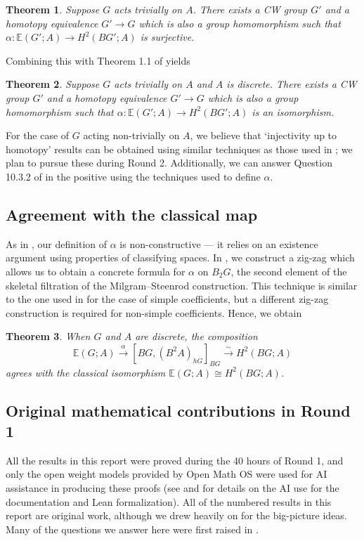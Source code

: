 \documentclass[12 pt]{article}
\newtheorem{theorem}{Theorem}[section]
\theoremstyle{definition}
\newcommand{\E}{\mathbb{E}}
\newcommand{\iso}{\xrightarrow{\sim}}
\begin{document}
\begin{theorem}\label{essential surjectivity}
Suppose $G$ acts trivially on $A$. There exists a CW group $G'$ and a homotopy equivalence $G'\to G$ which is also a group homomorphism such that $\alpha:\E(G';A)\to H^2(BG';A)$ is surjective.
\end{theorem}

Combining this with Theorem 1.1 of \cite{JJS} yields

\begin{theorem}\label{essential bijectivity}
Suppose $G$ acts trivially on $A$ and $A$ is discrete. There exists a CW group $G'$ and a homotopy equivalence $G'\to G$ which is also a group homomorphism such that $\alpha:\E(G';A)\to H^2(BG';A)$ is an isomorphism.
\end{theorem}

For the case of $G$ acting non-trivially on $A$, we believe that `injectivity up to homotopy' results can be obtained using similar techniques as those used in \cite{Ja}; we plan to pursue these during Round 2. Additionally, we can answer Question 10.3.2 of \cite{Ja} in the positive using the techniques used to define $\alpha$.

\subsection{Agreement with the classical map}
As in \cite{Ja, JJS}, our definition of $\alpha$ is non-constructive — it relies on an existence argument using properties of classifying spaces. In , we construct a zig-zag which allows us to obtain a concrete formula for $\alpha$ on $B_2G$, the second element of the skeletal filtration of the Milgram--Steenrod construction. This technique is similar to the one used in \cite{Ja} for the case of simple coefficients, but a different zig-zag construction is required for non-simple coefficients. Hence, we obtain

\begin{theorem}\label{(thm) G A discrete}
When $G$ and $A$ are discrete, the composition
$$\E(G;A)\overset{\alpha}{\to}[BG, (B^2A)_{hG}]_{BG}\iso H^2(BG;A)$$
agrees with the classical isomorphism $\E(G;A)\cong H^2(BG;A)$.
\end{theorem}

\subsection{Original mathematical contributions in Round 1}
All the results in this report were proved during the 40 hours of Round 1, and only the open weight models provided by Open Math OS were used for AI assistance in producing these proofs (see  and  for details on the AI use for the documentation and Lean formalization). All of the numbered results in this report are original work, although we drew heavily on \cite{Ja, JJS} for the big-picture ideas. Many of the questions we answer here were first raised in \cite{Ja}.
\end{document}
